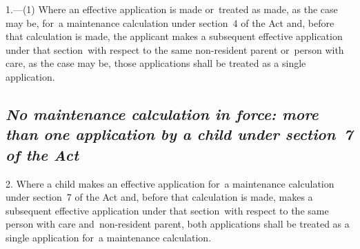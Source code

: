 \documentclass[12pt,a4paper]{article}
\begin{document}
1.---(1)  Where an effective application is made or~treated as made, as the case may be, for~a maintenance calculation under section~4 
of the Act and, before that calculation is made, the applicant makes a subsequent effective application under that section~with respect to the same non-resident parent or~person with care, as the case may be, those applications shall be treated as a single application.

%
%


\subsection*{\itshape No maintenance calculation in force: more than one application by a child under section~7 of the Act}

2.  Where a child makes an effective application for~a maintenance calculation under section~7 of the Act and, before that calculation is made, makes a subsequent effective application under that section~with respect to the same person with care and~non-resident parent, both applications shall be treated as a single application for~a maintenance calculation.
\end{document}
